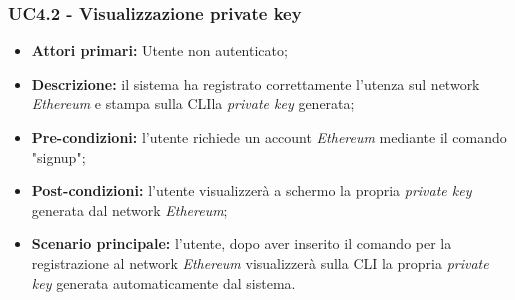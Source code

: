\subsubsection{UC4.2 - Visualizzazione private key\glo}
\begin{itemize}
	\item \textbf{Attori primari:} Utente non autenticato;
	\item \textbf{Descrizione:} il sistema ha registrato correttamente l'utenza sul network \textit{Ethereum\glos} e stampa sulla CLI\glo la \textit{private key\glo} generata; 
	\item \textbf{Pre-condizioni:} l'utente richiede un account \textit{Ethereum\glo} mediante il comando "signup"; 
	\item \textbf{Post-condizioni:} l'utente visualizzerà a schermo la propria \textit{private key\glo} generata dal network \textit{Ethereum\glos};
	\item \textbf{Scenario principale:} l'utente, dopo aver inserito il comando per la registrazione al network \textit{Ethereum\glo} visualizzerà sulla CLI la propria \textit{private key\glo} generata automaticamente dal sistema.
\end{itemize}